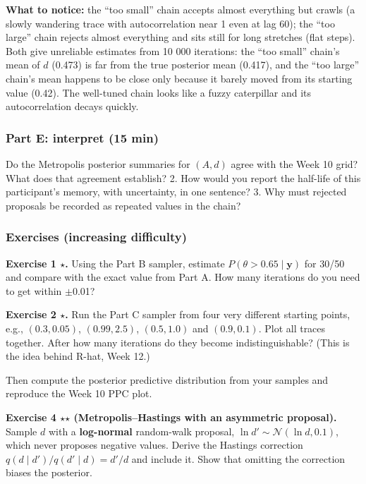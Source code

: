 \textbf{What to notice:} the ``too small'' chain accepts almost
everything but crawls (a slowly wandering trace with autocorrelation
near 1 even at lag 60); the ``too large'' chain rejects almost
everything and sits still for long stretches (flat steps). Both give
unreliable estimates from 10 000 iterations: the ``too small'' chain's
mean of \(d\) (0.473) is far from the true posterior mean (0.417), and
the ``too large'' chain's mean happens to be close only because it
barely moved from its starting value (0.42). The well-tuned chain looks
like a fuzzy caterpillar and its autocorrelation decays quickly.

\subsubsection{Part E: interpret (15 min)}

Do the Metropolis posterior summaries for \((A, d)\) agree with the Week
10 grid? What does that agreement establish? 2. How would you report the
half-life of this participant's memory, with uncertainty, in one
sentence? 3. Why must rejected proposals be recorded as repeated values
in the chain?

\subsubsection{Exercises (increasing difficulty)}

\textbf{Exercise 1 \ensuremath{\star}.} Using the Part B sampler, estimate
\(P(\theta > 0.65\mid\mathbf{y})\) for 30/50 and compare with the exact
value from Part A. How many iterations do you need to get within \ensuremath{\pm}0.01?

\textbf{Exercise 2 \ensuremath{\star}.} Run the Part C sampler from four very different
starting points, e.g., \((0.3, 0.05)\), \((0.99, 2.5)\), \((0.5, 1.0)\)
and \((0.9, 0.1)\). Plot all traces together. After how many iterations
do they become indistinguishable? (This is the idea behind R-hat, Week
12.)

Then compute the posterior predictive distribution from your samples and
reproduce the Week 10 PPC plot.

\textbf{Exercise 4 \ensuremath{\star}\ensuremath{\star} (Metropolis--Hastings with an asymmetric
proposal).} Sample \(d\) with a \textbf{log-normal} random-walk
proposal, \(\ln d' \sim \mathcal{N}(\ln d, 0.1)\), which never proposes
negative values. Derive the Hastings correction
\(q(d\mid d')/q(d'\mid d) = d'/d\) and include it. Show that omitting
the correction biases the posterior.

